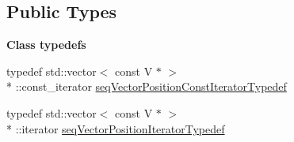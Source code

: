 \subsection*{Public Types}
\begin{Indent}{\bf Class typedefs}\par
\begin{DoxyCompactItemize}
\item 
typedef std\-::vector$<$ const V $\ast$ $>$\\*
\-::const\-\_\-iterator \hyperlink{class_q_u_e_s_o_1_1_sequence_of_vectors_a32cf32ccc0f85d14f227dc13399d2e0a}{seq\-Vector\-Position\-Const\-Iterator\-Typedef}
\item 
typedef std\-::vector$<$ const V $\ast$ $>$\\*
\-::iterator \hyperlink{class_q_u_e_s_o_1_1_sequence_of_vectors_ac33b1b9b3f22325b49618a6591dce818}{seq\-Vector\-Position\-Iterator\-Typedef}
\end{DoxyCompactItemize}
\end{Indent}
